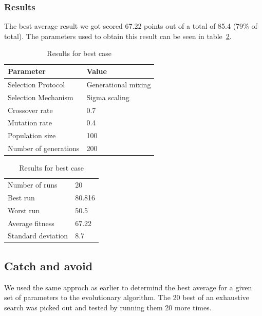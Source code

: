 \documentclass[10pt]{article}
\begin{document}
		\subsubsection{Results}
			The best average result we got scored 67.22 points out of a total of 85.4 (79\% of total). 
			The parameters used to obtain this result can be seen in table~\ref{tab:resultAll}. 
			\begin{table}[h]
				\parbox{.45\linewidth}{
					\centering
					\begin{tabular}{ll}
						Parameter & Value\\\hline
						Selection Protocol & Generational mixing\\
						Selection Mechanism & Sigma scaling\\
						Crossover rate & 0.7\\
						Mutation rate & 0.4\\
						Population size & 100\\
						Number of generations & 200
					\end{tabular}
					\caption{Parameters used to obtain best average case}
					\label{tab:resultAll}
				}
				\hfill
				\parbox{.45\linewidth}{
					\centering
					\begin{tabular}{ll}
						Number of runs & 20 \\
						Best run & 80.816\\
						Worst run & 50.5\\
						\hline
						Average fitness & 67.22\\
						Standard deviation & 8.7\\
					\end{tabular}
					\caption{Results for best case}
					\label{tab:resultAll}
				}
			\end{table}
	\subsection{Catch and avoid}
		We used the same approch as earlier to determind the best average for a given set of parameters to the evolutionary algorithm. The 20 best of an exhaustive search was picked out and tested by running them 20 more times. 
\end{document}
